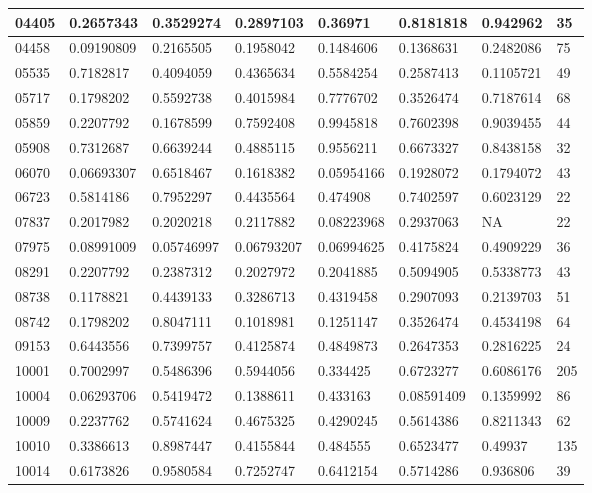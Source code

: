 \begin{anexosenv}
\begin{table}[H]
{\begin{tabular}{|l|l|l|l|l|l|l|l|}
						04405 & 0.2657343 & 0.3529274 & 0.2897103 & 0.36971 & 0.8181818 & 0.942962 & 35 \\ \hline
						04458 & 0.09190809 & 0.2165505 & 0.1958042 & 0.1484606 & 0.1368631 & 0.2482086 & 75 \\ \hline
						05535 & 0.7182817 & 0.4094059 & 0.4365634 & 0.5584254 & 0.2587413 & 0.1105721 & 49 \\ \hline
						05717 & 0.1798202 & 0.5592738 & 0.4015984 & 0.7776702 & 0.3526474 & 0.7187614 & 68 \\ \hline
						05859 & 0.2207792 & 0.1678599 & 0.7592408 & 0.9945818 & 0.7602398 & 0.9039455 & 44 \\ \hline
						05908 & 0.7312687 & 0.6639244 & 0.4885115 & 0.9556211 & 0.6673327 & 0.8438158 & 32 \\ \hline
						06070 & 0.06693307 & 0.6518467 & 0.1618382 & 0.05954166 & 0.1928072 & 0.1794072 & 43 \\ \hline
						06723 & 0.5814186 & 0.7952297 & 0.4435564 & 0.474908 & 0.7402597 & 0.6023129 & 22 \\ \hline
						07837 & 0.2017982 & 0.2020218 & 0.2117882 & 0.08223968 & 0.2937063 & NA & 22 \\ \hline
						07975 & 0.08991009 & 0.05746997 & 0.06793207 & 0.06994625 & 0.4175824 & 0.4909229 & 36 \\ \hline
						08291 & 0.2207792 & 0.2387312 & 0.2027972 & 0.2041885 & 0.5094905 & 0.5338773 & 43 \\ \hline
						08738 & 0.1178821 & 0.4439133 & 0.3286713 & 0.4319458 & 0.2907093 & 0.2139703 & 51 \\ \hline
						08742 & 0.1798202 & 0.8047111 & 0.1018981 & 0.1251147 & 0.3526474 & 0.4534198 & 64 \\ \hline
						09153 & 0.6443556 & 0.7399757 & 0.4125874 & 0.4849873 & 0.2647353 & 0.2816225 & 24 \\ \hline
						10001 & 0.7002997 & 0.5486396 & 0.5944056 & 0.334425 & 0.6723277 & 0.6086176 & 205 \\ \hline
						10004 & 0.06293706 & 0.5419472 & 0.1388611 & 0.433163 & 0.08591409 & 0.1359992 & 86 \\ \hline
						10009 & 0.2237762 & 0.5741624 & 0.4675325 & 0.4290245 & 0.5614386 & 0.8211343 & 62 \\ \hline
						10010 & 0.3386613 & 0.8987447 & 0.4155844 & 0.484555 & 0.6523477 & 0.49937 & 135 \\ \hline
						10014 & 0.6173826 & 0.9580584 & 0.7252747 & 0.6412154 & 0.5714286 & 0.936806 & 39 \\ \hline

\end{tabular}}
\end{table}
\end{anexosenv}

